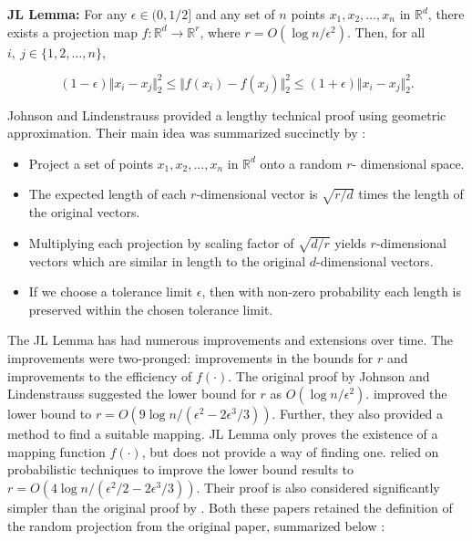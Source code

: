 \textbf{JL Lemma:} For any $\epsilon \in (0, 1/2]$ and any set of $n$ points $x_1, x_2, \dots, x_n$ in $\mathds{R}^d$, there exists a projection map $f: \mathds{R}^d \rightarrow \mathds{R}^r$, where $r= O(\log n /\epsilon^2)$. Then, for all $i,\  j \in \{1, 2, \dots, n\}$, 

\begin{equation}
(1-\epsilon)\Vert x_i-x_j \Vert_2^2 \leq \Vert f(x_i)-f(x_j)\Vert_2^2 \leq (1+\epsilon)\Vert x_i-x_j \Vert_2^2.
\end{equation}



Johnson and Lindenstrauss provided a lengthy technical proof using geometric approximation. Their main idea was summarized succinctly by  \cite{fedoruk_dimensionality_2018}:

\begin{itemize}
\item Project a set of points $x_1, x_2, \dots, x_n$ in  $\mathds{R}^d$ onto a random $r$- dimensional space. 
\item The expected length of each $r$-dimensional vector is $\sqrt{r/d}$ times the length of the original vectors. 
\item Multiplying each projection by  scaling factor of $\sqrt{d/r}$ yields $r$-dimensional vectors which are similar in length to the original $d$-dimensional vectors. 
\item If we choose a tolerance limit $\epsilon$, then with non-zero probability each length is preserved within the chosen tolerance limit. 
\end{itemize}

The JL Lemma has had numerous improvements and extensions over time. The improvements were two-pronged: improvements in the bounds for $r$ and improvements to the efficiency of $f(\cdot)$. The original proof by Johnson and Lindenstrauss suggested the lower bound for $r$ as $O(\log n /\epsilon^2)$. \cite{frankl1988} improved the lower bound to $r = O(9\log n /(\epsilon^2 - 2\epsilon^3/3))$. Further, they also provided a method to find a suitable mapping. JL Lemma only proves the existence of a mapping function $f(\cdot)$, but does not provide a way of finding one. \cite{dasgupta_elementary_2003} relied on probabilistic techniques to improve the lower bound results to $r= O(4\log n /(\epsilon^2/2 - 2\epsilon^3/3))$. Their proof is also considered significantly simpler than the original proof by \cite{JL1984}. Both these papers retained the definition of the random projection from the original paper, summarized below \cite{ailon_fast_2009} :

